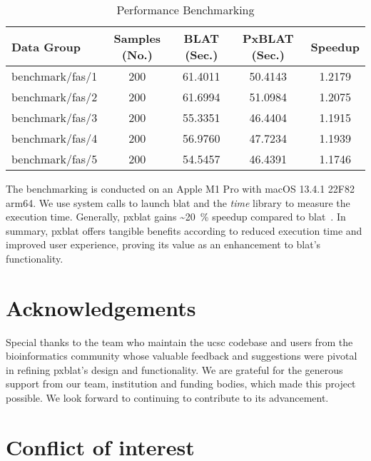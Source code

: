 \begin{table*}
	\centering
	\caption{Performance  Benchmarking}
	\label{tab:performance-evaluation}
	\begin{tabular}{lSSSS}
		\toprule
		Data Group      & {Samples (No.)} & {BLAT (Sec.)} & {PxBLAT (Sec.)} & {Speedup} \\
		\midrule
		benchmark/fas/1 & 200             & 61.4011       & 50.4143         & 1.2179    \\
		benchmark/fas/2 & 200             & 61.6994       & 51.0984         & 1.2075    \\
		benchmark/fas/3 & 200             & 55.3351       & 46.4404         & 1.1915    \\
		benchmark/fas/4 & 200             & 56.9760       & 47.7234         & 1.1939    \\
		benchmark/fas/5 & 200             & 54.5457       & 46.4391         & 1.1746    \\
		\bottomrule
	\end{tabular}
\end{table*}

The benchmarking is conducted on an Apple M1 Pro with macOS 13.4.1 22F82 arm64.
We use system calls to launch \gls{blat} and the \emph{time} library to measure the execution time.
Generally, \gls{pxblat} gains \textasciitilde\SI[per-mode=symbol,round-precision=0]{20}{\percent} speedup compared to \gls{blat}~.
In summary, \gls{pxblat}  offers tangible benefits according to reduced execution time and improved user experience, proving its value as an enhancement to \gls{blat}'s functionality.


\section*{Acknowledgements}\label{sec:acknowledgements}

Special thanks to the team who maintain the \gls{ucsc} codebase and users from the bioinformatics community whose valuable feedback and suggestions were pivotal in refining \gls{pxblat}'s design and functionality.
We are grateful for the generous support from our team, institution and funding bodies, which made this project possible.
We look forward to continuing to contribute to its advancement.

\section*{Conflict of interest}\label{sec:conflict-of-interest}

